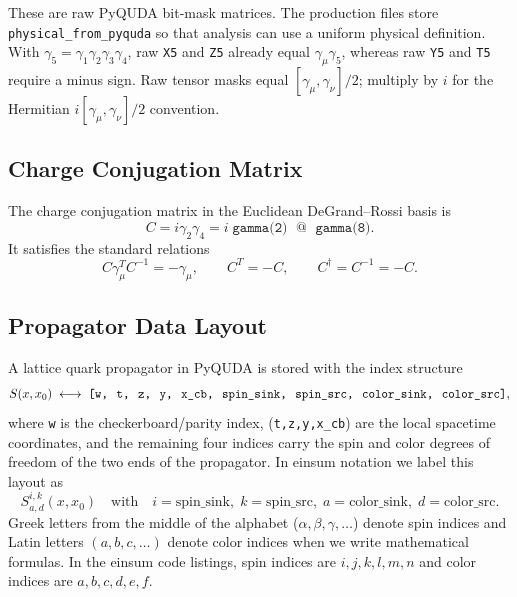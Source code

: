 \documentclass[11pt,a4paper]{article}
\newcommand{\Cmat}{C}
\newcommand{\fwprop}{S}
\begin{document}
These are raw PyQUDA bit-mask matrices.  The production files store
\texttt{physical\_from\_pyquda} so that analysis can use a uniform physical
definition.  With \(\gamma_5=\gamma_1\gamma_2\gamma_3\gamma_4\), raw
\texttt{X5} and \texttt{Z5} already equal \(\gamma_\mu\gamma_5\), whereas raw
\texttt{Y5} and \texttt{T5} require a minus sign.  Raw tensor masks equal
\([\gamma_\mu,\gamma_\nu]/2\); multiply by \(i\) for the Hermitian
\(i[\gamma_\mu,\gamma_\nu]/2\) convention.

\subsection{Charge Conjugation Matrix}

The charge conjugation matrix in the Euclidean DeGrand--Rossi basis is
\begin{equation}
  \Cmat = i\gamma_{2}\gamma_{4}
        = i\;\texttt{gamma(2)}\;\texttt{ @ }\;\texttt{gamma(8)}.
\end{equation}
It satisfies the standard relations
\begin{equation}
  \Cmat\gamma_{\mu}^{T}\Cmat^{-1} = -\gamma_{\mu},\qquad
  \Cmat^{T} = -\Cmat,\qquad
  \Cmat^{\dagger} = \Cmat^{-1} = -\Cmat.
\end{equation}

\subsection{Propagator Data Layout}

A lattice quark propagator in PyQUDA is stored with the index structure
\begin{equation}
  \fwprop(x,x_{0}) \;\longleftrightarrow\;
  \texttt{[w,\, t,\, z,\, y,\, x\_cb,\, spin\_sink,\, spin\_src,\, color\_sink,\, color\_src]},
\end{equation}
where \texttt{w} is the checkerboard/parity index, (\texttt{t,z,y,x\_cb}) are the
local spacetime coordinates, and the remaining four indices carry the spin and color
degrees of freedom of the two ends of the propagator.  In einsum notation we label
this layout as
\begin{equation}
  \fwprop^{i,k}_{a,d}(x,x_{0}) \quad\text{with}\quad
  i = \text{spin\_sink},\; k = \text{spin\_src},\;
  a = \text{color\_sink},\; d = \text{color\_src}.
\end{equation}
Greek letters from the middle of the alphabet ($\alpha,\beta,\gamma,\dots$) denote
spin indices and Latin letters $(a,b,c,\dots)$ denote color indices when we write
mathematical formulas.  In the einsum code listings, spin indices are
$i,j,k,l,m,n$ and color indices are $a,b,c,d,e,f$.
\end{document}
